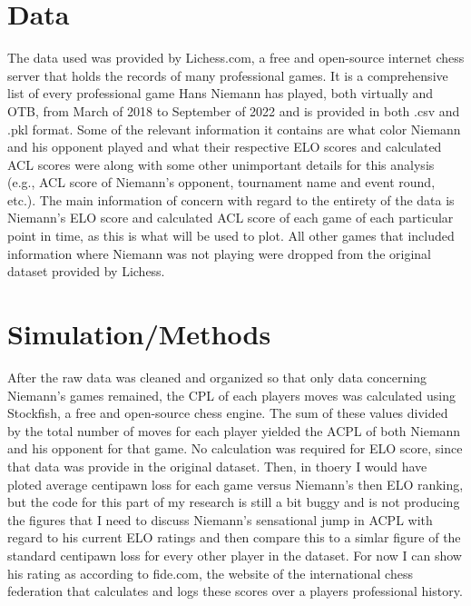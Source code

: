 \documentclass[12pt]{article}
\begin{document}
\section*{Data}
\label{sec:data}

The data used was provided by Lichess.com, a free and open-source internet chess server that holds the records of many professional games. It is a comprehensive list of every professional game Hans Niemann has played, both virtually and OTB, from March of 2018 to September of 2022 and is provided in both .csv and .pkl format. Some of the relevant information it contains are what color Niemann and his opponent played and what their respective ELO scores and calculated ACL scores were along with some other unimportant details for this analysis (e.g., ACL score of Niemann's opponent, tournament name and event round, etc.). The main information of concern with regard to the entirety of the data is Niemann's ELO score and calculated ACL score of each game of each particular point in time, as this is what will be used to plot. All other games that included information where Niemann was not playing were dropped from the original dataset provided by Lichess.

\section*{Simulation/Methods}
\label{sec:sim}


After the raw data was cleaned and organized so that only data concerning Niemann's games remained, the CPL of each players moves was calculated using Stockfish, a free and open-source chess engine. The sum of these values divided by the total number of moves for each player yielded the ACPL of both Niemann and his opponent for that game. No calculation was required for ELO score, since that data was provide in the original dataset. Then, in thoery I would have ploted average centipawn loss for each game versus Niemann's then ELO ranking, but the code for this part of my research is still a bit buggy and is not producing the figures that I need to discuss Niemann's sensational jump in ACPL with regard to his current ELO ratings and then compare this to a simlar figure of the standard centipawn loss for every other player in the dataset. For now I can show his rating as according to fide.com, the website of the international chess federation that calculates and logs these scores over a players professional history.
\end{document}
